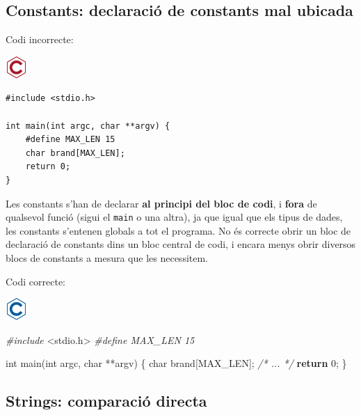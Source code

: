 \documentclass[
]{book}
\newenvironment{Shaded}{\begin{snugshade}}{\end{snugshade}}
\newcommand{\CommentTok}[1]{\textcolor[rgb]{0.56,0.35,0.01}{\textit{#1}}}
\newcommand{\ControlFlowTok}[1]{\textcolor[rgb]{0.13,0.29,0.53}{\textbf{#1}}}
\newcommand{\DataTypeTok}[1]{\textcolor[rgb]{0.13,0.29,0.53}{#1}}
\newcommand{\DecValTok}[1]{\textcolor[rgb]{0.00,0.00,0.81}{#1}}
\newcommand{\ImportTok}[1]{#1}
\newcommand{\NormalTok}[1]{#1}
\newcommand{\PreprocessorTok}[1]{\textcolor[rgb]{0.56,0.35,0.01}{\textit{#1}}}
\begin{document}
\hypertarget{constants-declaraciuxf3-de-constants-mal-ubicada}{%
\subsection{Constants: declaració de constants mal ubicada}\label{constants-declaraciuxf3-de-constants-mal-ubicada}}

Codi incorrecte:

\includegraphics{./img/c_err.png}

\begin{verbatim}
#include <stdio.h>

int main(int argc, char **argv) {
    #define MAX_LEN 15
    char brand[MAX_LEN];
    return 0;
}
\end{verbatim}

Les constants s'han de declarar \textbf{al principi del bloc de codi}, i \textbf{fora} de qualsevol funció (sigui el \texttt{main} o una altra), ja que igual que els tipus de dades, les constants s'entenen globals a tot el programa. No és correcte obrir un bloc de declaració de constants dins un bloc central de codi, i encara menys obrir diversos blocs de constants a mesura que les necessitem.

Codi correcte:

\includegraphics{./img/c.png}

\begin{Shaded}
\begin{Highlighting}[]
\PreprocessorTok{\#include }\ImportTok{\textless{}stdio.h\textgreater{}}
\PreprocessorTok{\#define MAX\_LEN 15}

\DataTypeTok{int}\NormalTok{ main(}\DataTypeTok{int}\NormalTok{ argc, }\DataTypeTok{char}\NormalTok{ **argv) \{}
    \DataTypeTok{char}\NormalTok{ brand[MAX\_LEN];}
    \CommentTok{/* ... */}
    \ControlFlowTok{return} \DecValTok{0}\NormalTok{;}
\NormalTok{\}}
\end{Highlighting}
\end{Shaded}

\hypertarget{strings-comparaciuxf3-directa}{%
\subsection{Strings: comparació directa}\label{strings-comparaciuxf3-directa}}
\end{document}
